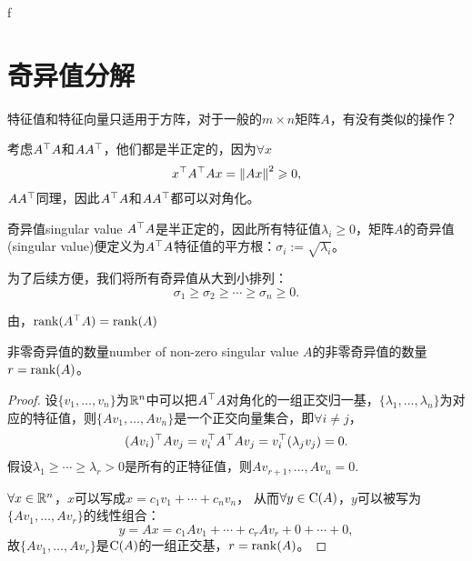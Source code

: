 f\chapter{奇异值分解}
特征值和特征向量只适用于方阵，对于一般的$m\times n$矩阵$A$，有没有类似的操作？

考虑$A^\top A$和$AA^\top$，他们都是半正定的，因为$\forall x$
\[
	x^\top A^\top Ax=\left\lVert Ax\right\rVert^2\geqslant 0,
\]
$AA^\top$同理，因此$A^\top A$和$AA^\top$都可以对角化。
\begin{definition}{奇异值}{singular value}
	$A^\top A$是半正定的，因此所有特征值$\lambda_i\geqslant 0$，矩阵$A$的奇异值(singular value)便定义为$A^\top A$特征值的平方根：$\sigma_i:=\sqrt{\lambda_i}$。

	为了后续方便，我们将所有奇异值从大到小排列：
	\[
		\sigma_1\geqslant\sigma_2\geqslant\cdots\geqslant\sigma_n\geqslant 0.
	\]
\end{definition}
由，$\operatorname{rank}(A^\top A)=\operatorname{rank}(A)$
\begin{theorem}{非零奇异值的数量}{number of non-zero singular value}
	$A$的非零奇异值的数量$r=\operatorname{rank}(A)$。
\end{theorem}
\begin{proof}
	设$\{v_1,\ldots,v_n\}$为$\mathbb R^n$中可以把$A^\top A$对角化的一组正交归一基，$\{\lambda_1,\ldots,\lambda_n\}$为对应的特征值，则$\{Av_1,\ldots,Av_n\}$是一个正交向量集合，即$\forall i\neq j$，
	\[
		(Av_i)^\top Av_j=v_i^\top A^\top Av_j=v_i^\top(\lambda_jv_j)=0.
	\]
	假设$\lambda_1\geqslant\cdots\geqslant\lambda_r>0$是所有的正特征值，则$Av_{r+1},\ldots,Av_n=0$.
	
	$\forall x\in\mathbb R^n$，$x$可以写成$x=c_1v_1+\cdots+c_nv_n$，
	从而$\forall y\in\operatorname{C}(A)$，$y$可以被写为$\{Av_1,\ldots,Av_r\}$的线性组合：
	\[
		y=Ax=c_1Av_1+\cdots+c_rAv_r+0+\cdots+0,
	\]
	故$\{Av_1,\ldots,Av_r\}$是$\operatorname{C}(A)$的一组正交基，$r=\operatorname{rank}(A)$。
\end{proof}
